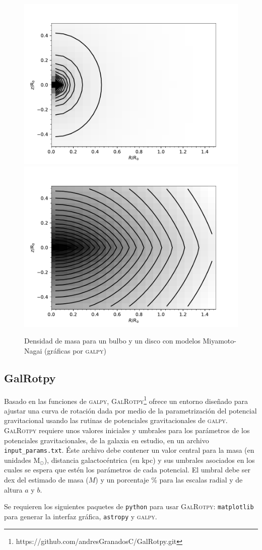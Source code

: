 \begin{figure}
  \centering
    \includegraphics[width=0.4\columnwidth]{Kap2/Bulge.pdf}
    \includegraphics[width=0.4\columnwidth]{Kap2/TnDisk.pdf}
  \caption{Densidad de masa para un bulbo y un disco con modelos Miyamoto-Nagai (gráficas por \textsc{galpy})}
  \label{fig:Fi1}
\end{figure}

\subsection{GalRotpy}

Basado en las funciones de \textsc{galpy}, \textsc{GalRotpy}\footnote{https://github.com/andresGranadosC/GalRotpy.git} ofrece un entorno diseñado para ajustar una curva de rotación dada por medio de la parametrización del potencial gravitacional usando las rutinas de potenciales gravitacionales de \textsc{galpy}.\\

\textsc{GalRotpy} requiere unos valores iniciales y umbrales para los parámetros de los potenciales gravitacionales, de la galaxia en estudio, en un archivo \verb+input_params.txt+. Éste archivo debe contener un valor central para la masa (en unidades  M$_\odot$), distancia galactocéntrica (en kpc) y sus umbrales asociados en los cuales se espera que estén los parámetros de cada potencial. El umbral debe ser dex del estimado de masa ($M$) y un porcentaje \% para las escalas radial y de altura $a$ y $b$.

Se requieren los siguientes paquetes de \verb+python+ para usar \textsc{GalRotpy}: \verb+matplotlib+ para generar la interfaz gráfica, \verb+astropy+ y \textsc{galpy}.\\


